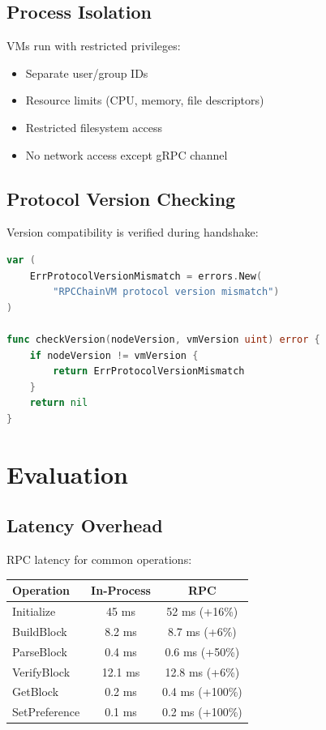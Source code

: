 \documentclass[11pt,letterpaper]{article}
\begin{document}
\subsection{Process Isolation}

VMs run with restricted privileges:

\begin{itemize}
    \item Separate user/group IDs
    \item Resource limits (CPU, memory, file descriptors)
    \item Restricted filesystem access
    \item No network access except gRPC channel
\end{itemize}

\subsection{Protocol Version Checking}

Version compatibility is verified during handshake:

\begin{lstlisting}[language=Go, caption=Version Check]
var (
    ErrProtocolVersionMismatch = errors.New(
        "RPCChainVM protocol version mismatch")
)

func checkVersion(nodeVersion, vmVersion uint) error {
    if nodeVersion != vmVersion {
        return ErrProtocolVersionMismatch
    }
    return nil
}
\end{lstlisting}

\section{Evaluation}

\subsection{Latency Overhead}

RPC latency for common operations:

\begin{center}
\begin{tabular}{lcc}
\toprule
\textbf{Operation} & \textbf{In-Process} & \textbf{RPC} \\
\midrule
Initialize & 45 ms & 52 ms (+16\%) \\
BuildBlock & 8.2 ms & 8.7 ms (+6\%) \\
ParseBlock & 0.4 ms & 0.6 ms (+50\%) \\
VerifyBlock & 12.1 ms & 12.8 ms (+6\%) \\
GetBlock & 0.2 ms & 0.4 ms (+100\%) \\
SetPreference & 0.1 ms & 0.2 ms (+100\%) \\
\bottomrule
\end{tabular}
\end{center}
\end{document}
